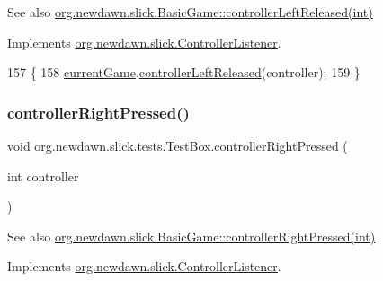 \begin{DoxySeeAlso}{See also}
\mbox{\hyperlink{classorg_1_1newdawn_1_1slick_1_1_basic_game_a0fd5869789b811258bc2d8d562c36243}{org.\+newdawn.\+slick.\+Basic\+Game\+::controller\+Left\+Released(int)}} 
\end{DoxySeeAlso}


Implements \mbox{\hyperlink{interfaceorg_1_1newdawn_1_1slick_1_1_controller_listener_ad2f898f0efe21771a0d9568c454dea0d}{org.\+newdawn.\+slick.\+Controller\+Listener}}.


\begin{DoxyCode}
157                                                        \{
158         \mbox{\hyperlink{classorg_1_1newdawn_1_1slick_1_1tests_1_1_test_box_a5e0fdb2f97173d828af597044c525078}{currentGame}}.\mbox{\hyperlink{classorg_1_1newdawn_1_1slick_1_1_basic_game_a0fd5869789b811258bc2d8d562c36243}{controllerLeftReleased}}(controller);
159     \}
\end{DoxyCode}
\mbox{\label{classorg_1_1newdawn_1_1slick_1_1tests_1_1_test_box_aa1a006cc38225d293dfceec4c8995bdf}} 
\subsubsection{\texorpdfstring{controller\+Right\+Pressed()}{controllerRightPressed()}}
{\footnotesize\ttfamily void org.\+newdawn.\+slick.\+tests.\+Test\+Box.\+controller\+Right\+Pressed (\begin{DoxyParamCaption}\item[{int}]{controller }\end{DoxyParamCaption})\hspace{0.3cm}{\ttfamily [inline]}}

\begin{DoxySeeAlso}{See also}
\mbox{\hyperlink{classorg_1_1newdawn_1_1slick_1_1_basic_game_a8c225d55800c95a5b339468d08fcf48c}{org.\+newdawn.\+slick.\+Basic\+Game\+::controller\+Right\+Pressed(int)}} 
\end{DoxySeeAlso}


Implements \mbox{\hyperlink{interfaceorg_1_1newdawn_1_1slick_1_1_controller_listener_ae4ac64996df9778c4987705275792780}{org.\+newdawn.\+slick.\+Controller\+Listener}}.


